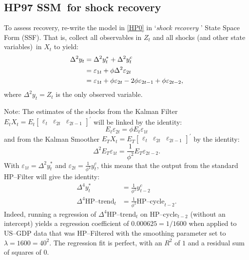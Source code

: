 \documentclass[a4paper,12pt]{article}
\begin{document}
\subsection{HP97 SSM\ for shock recovery}

To assess recovery, re-write the model in \ref{HP0} in `\emph{shock recovery}%
' State Space Form (SSF). That is, collect all observables in $Z_{t}$ and
all shocks (and other state variables)\ in $X_{t}$ to yield:%
\begin{align}
\Delta ^{2}y_{t}& =\Delta ^{2}y_{t}^{\ast }+\Delta ^{2}y_{t}^{c}  \notag \\
& =\varepsilon _{1t}+\phi \Delta ^{2}\varepsilon _{2t}  \notag \\
& =\varepsilon _{1t}+\phi \varepsilon _{2t}-2\phi \varepsilon _{2t-1}+\phi
\varepsilon _{2t-2},  \label{Z}
\end{align}%
where $\Delta ^{2}y_{t}=Z_{t}$ is the only observed variable.

Note: The estimates of the shocks from the Kalman Filter $E_{t}X_{t}=E_{t}%
\begin{bmatrix}
\varepsilon _{t} & \varepsilon _{2t} & \varepsilon _{2t-1}%
\end{bmatrix}%
^{\prime }$ will be linked by the identity:%
\begin{equation*}
E_{t}\varepsilon _{2t}=\phi E_{t}\varepsilon _{1t}
\end{equation*}%
and from the Kalman Smoother $E_{T}X_{t}=E_{T}%
\begin{bmatrix}
\varepsilon _{t} & \varepsilon _{2t} & \varepsilon _{2t-1}%
\end{bmatrix}%
^{\prime }$ by the identity: 
\begin{equation}
\Delta ^{2}E_{T}\varepsilon _{1t}=\frac{1}{\phi ^{2}}E_{T}\varepsilon
_{2t-2}.  \label{KS}
\end{equation}%
With $\varepsilon _{1t}=\Delta ^{2}y_{t}^{\ast }$ and $\varepsilon _{2t}=%
\frac{1}{\phi ^{2}}y_{t}^{c}$, this means that the output from the standard
HP--Filter will give the identity:%
\begin{align*}
\Delta ^{4}y_{t}^{\ast }& =\frac{1}{\phi ^{2}}y_{t-2}^{c} \\
\Delta ^{4}\text{HP--trend}_{t}& =\frac{1}{\phi ^{2}}\text{HP--cycle}_{t-2}.
\end{align*}%
Indeed, running a regression of $\Delta ^{4}$HP--trend$_{t}$ on HP--cycle$%
_{t-2}$ (without an intercept) yields a regression coefficient of $%
0.000625=1/1600$ when applied to US--GDP data that was HP--Filtered with the
smoothing parameter set to $\lambda =1600=40^{2}$. The regression fit is
perfect, with an $R^{2}$ of $1$ and a residual sum of squares of $0.$
\end{document}
